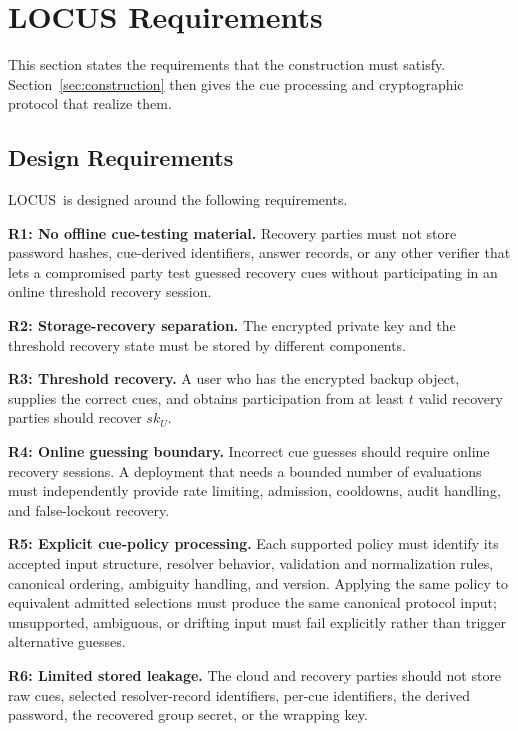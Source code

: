 \documentclass[sigconf,anonymous]{acmart}
\newcounter{protocol}
\newcommand{\LOCUS}{\textsf{LOCUS}}
\begin{document}
\section{LOCUS Requirements}
\label{sec:locus-requirements}

This section states the requirements that the construction must satisfy. Section~\ref{sec:construction} then gives the cue processing and cryptographic protocol that realize them.

\subsection{Design Requirements}
\label{sec:design-requirements}

\LOCUS\ is designed around the following requirements.

\textbf{R1: No offline cue-testing material.}
Recovery parties must not store password hashes, cue-derived identifiers, answer records, or any other verifier that lets a compromised party test guessed recovery cues without participating in an online threshold recovery session.

\textbf{R2: Storage-recovery separation.}
The encrypted private key and the threshold recovery state must be stored by different components.

\textbf{R3: Threshold recovery.}
A user who has the encrypted backup object, supplies the correct cues, and obtains participation from at least \(t\) valid recovery parties should recover \(sk_U\).

\textbf{R4: Online guessing boundary.}
Incorrect cue guesses should require online recovery sessions. A deployment that
needs a bounded number of evaluations must independently provide rate limiting,
admission, cooldowns, audit handling, and false-lockout recovery.

\textbf{R5: Explicit cue-policy processing.}
Each supported policy must identify its accepted input structure, resolver behavior, validation and normalization rules, canonical ordering, ambiguity handling, and version. Applying the same policy to equivalent admitted selections must produce the same canonical protocol input; unsupported, ambiguous, or drifting input must fail explicitly rather than trigger alternative guesses.

\textbf{R6: Limited stored leakage.}
The cloud and recovery parties should not store raw cues, selected resolver-record identifiers, per-cue identifiers, the derived password, the recovered group secret, or the wrapping key.
\end{document}
